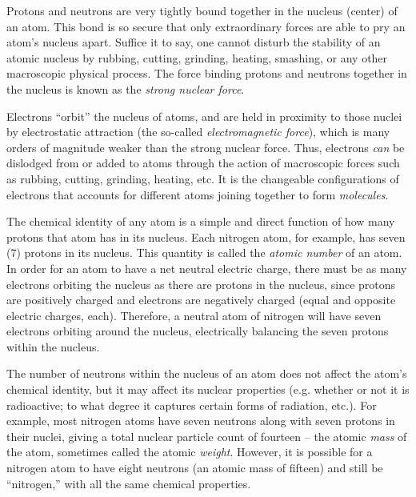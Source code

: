 Protons and neutrons are very tightly bound together in the nucleus (center) of an atom.  This bond is so secure that only extraordinary forces are able to pry an atom's nucleus apart.  Suffice it to say, one cannot disturb the stability of an atomic nucleus by rubbing, cutting, grinding, heating, smashing, or any other macroscopic physical process.  The force binding protons and neutrons together in the nucleus is known as the \textit{strong nuclear force}.  

Electrons ``orbit'' the nucleus of atoms, and are held in proximity to those nuclei by electrostatic attraction (the so-called \textit{electromagnetic force}), which is many orders of magnitude weaker than the strong nuclear force.  Thus, electrons \textit{can} be dislodged from or added to atoms through the action of macroscopic forces such as rubbing, cutting, grinding, heating, etc.  It is the changeable configurations of electrons that accounts for different atoms joining together to form \textit{molecules}.  

The chemical identity of any atom is a simple and direct function of how many protons that atom has in its nucleus.  Each nitrogen atom, for example, has seven (7) protons in its nucleus.  This quantity is called the \textit{atomic number} of an atom.  In order for an atom to have a net neutral electric charge, there must be as many electrons orbiting the nucleus as there are protons in the nucleus, since protons are positively charged and electrons are negatively charged (equal and opposite electric charges, each).  Therefore, a neutral atom of nitrogen will have seven electrons orbiting around the nucleus, electrically balancing the seven protons within the nucleus.  

The number of neutrons within the nucleus of an atom does not affect the atom's chemical identity, but it may affect its nuclear properties (e.g. whether or not it is radioactive; to what degree it captures certain forms of radiation, etc.).  For example, most nitrogen atoms have seven neutrons along with seven protons in their nuclei, giving a total nuclear particle count of fourteen -- the atomic \textit{mass} of the atom, sometimes called the atomic \textit{weight}.  However, it is possible for a nitrogen atom to have eight neutrons (an atomic mass of fifteen) and still be ``nitrogen,'' with all the same chemical properties.    

\filbreak

